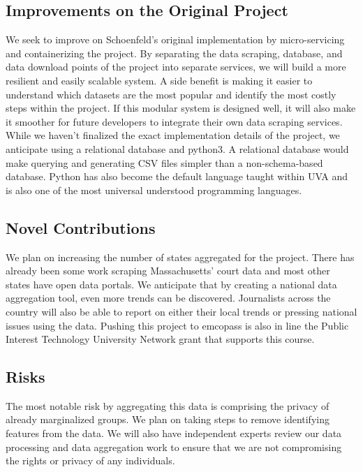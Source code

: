 \documentclass[12pt]{article}
\begin{document}
\subsection{Improvements on the Original Project}

\noindent We seek to improve on Schoenfeld's original implementation by micro-servicing and containerizing the project. 
By separating the data scraping, database, and data download points of the project into separate services, we will build a more resilient and easily scalable system.
A side benefit is making it easier to understand which datasets are the most popular and identify the most costly steps within the project.
If this modular system is designed well, it will also make it smoother for future developers to integrate their own data scraping services.
While we haven't finalized the exact implementation details of the project, we anticipate using a relational database and python3.
A relational database would make querying and generating CSV files simpler than a non-schema-based database.
Python has also become the default language taught within UVA and is also one of the most universal understood programming languages.

\subsection{Novel Contributions}

\noindent We plan on increasing the number of states aggregated for the project. 
There has already been some work scraping Massachusetts' court data and most other states have open data portals.
We anticipate that by creating a national data aggregation tool, even more trends can be discovered.
Journalists across the country will also be able to report on either their local trends or pressing national issues using the data.
Pushing this project to emcopass is also in line the Public Interest Technology University Network grant that supports this course.

\subsection{Risks}

\noindent The most notable risk by aggregating this data is comprising the privacy of already marginalized groups.
We plan on taking steps to remove identifying features from the data.
We will also have independent experts review our data processing and data aggregation work to ensure that we are not compromising the rights or privacy of any individuals.
\end{document}
